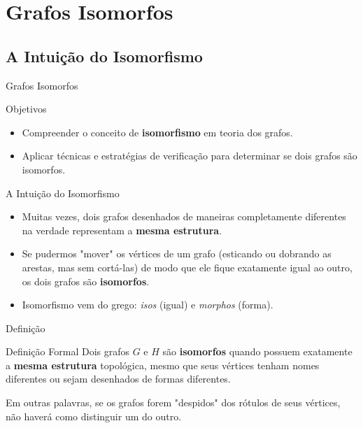 \documentclass[9pt]{beamer}
\begin{document}
\section{Grafos Isomorfos}
\subsection{A Intuição do Isomorfismo}
\begin{frame}{Grafos Isomorfos}
    \begin{block}{Objetivos}
        \begin{itemize}
            \item Compreender o conceito de \textbf{isomorfismo} em teoria dos grafos.
            \item Aplicar técnicas e estratégias de verificação para determinar se dois grafos são isomorfos.
        \end{itemize}
    \end{block}
\end{frame}

\begin{frame}{A Intuição do Isomorfismo}
    \begin{itemize}
        \item Muitas vezes, dois grafos desenhados de maneiras completamente diferentes na verdade representam a \textbf{mesma estrutura}.
        \item Se pudermos "mover" os vértices de um grafo (esticando ou dobrando as arestas, mas sem cortá-las) de modo que ele fique exatamente igual ao outro, os dois grafos são \textbf{isomorfos}.
        \item Isomorfismo vem do grego: \textit{isos} (igual) e \textit{morphos} (forma).
    \end{itemize}
\end{frame}

\begin{frame}{Definição}
    \begin{block}{Definição Formal}
        Dois grafos $G$ e $H$ são \textbf{isomorfos} quando possuem exatamente a \textbf{mesma estrutura} topológica, mesmo que seus vértices tenham nomes diferentes ou sejam desenhados de formas diferentes.
    \end{block}
    \vspace{0.5cm}
    Em outras palavras, se os grafos forem "despidos" dos rótulos de seus vértices, não haverá como distinguir um do outro.
\end{frame}
\end{document}
